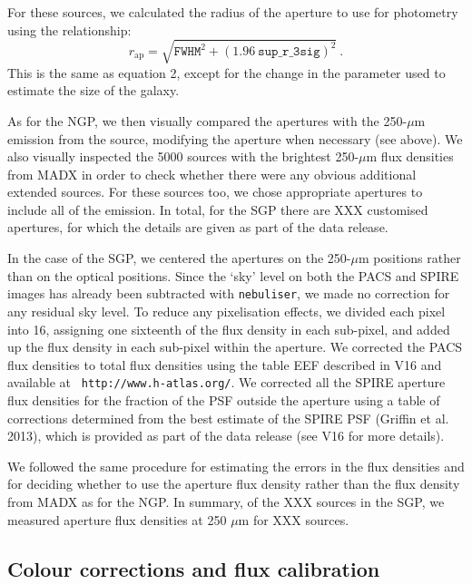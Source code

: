 \documentclass[useAMS,usenatbib]{mnras}
\begin{document}
For these sources, we calculated the radius of the aperture
to use for photometry using the relationship:
\smallskip
\begin{equation} 
r_\mathrm{ap} = \sqrt{ \mathtt{FWHM}^2 + {(1.96
    \ \mathtt{sup\_r\_3sig})}^2}\ .
\end{equation}
\smallskip
\noindent This is the same as equation 2, except for the change
in the parameter used to estimate the size of the galaxy.

As for the NGP, we then visually compared the apertures with the
250-$\mu$m emission from the source, modifying the aperture when
necessary (see above).  We also visually inspected the 5000 sources
with the brightest 250-$\mu$m flux densities from MADX in order to
check whether there were any obvious additional extended sources.  For
these sources too, we chose appropriate apertures to include all of
the emission.  In total, for the SGP there are XXX customised
apertures, for which the details are given as part of the data
release.

In the case of the SGP, we centered the apertures on the 250-$\mu$m
positions rather than on the optical positions.  Since the `sky' level
on both the PACS and SPIRE images has already been subtracted with
{\tt nebuliser}, we made no correction for any residual sky level.  To
reduce any pixelisation effects, we divided each pixel into 16,
assigning one sixteenth of the flux density in each sub-pixel, and
added up the flux density in each sub-pixel within the aperture.  We
corrected the PACS flux densities to total flux densities using the
table EEF described in V16 and available at {\tt
  http://www.h-atlas.org/}.  We corrected all the SPIRE aperture flux
densities for the fraction of the PSF outside the aperture using a
table of corrections determined from the best estimate of the SPIRE
PSF (Griffin et al. 2013), which is provided as part of the data
release (see V16 for more details).

We followed the same procedure for estimating the errors in the
flux densities and for deciding whether to use the aperture flux
density rather than the flux density from MADX as for the NGP.
In summary, of the XXX sources in the SGP, we measured aperture
flux densities at 250 $\mu$m for XXX sources. 


\subsection{Colour corrections and flux calibration}
\end{document}
